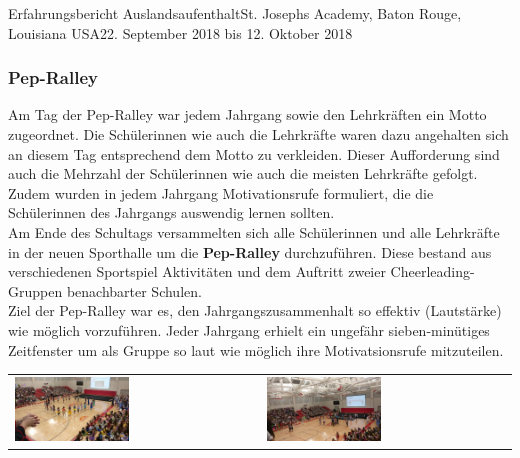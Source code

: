 \documentclass[oneside,openany,headings=optiontotoc,11pt,numbers=noenddot]{article}
\begin{document}
\begin{worksheet}{Erfahrungsbericht Auslandsaufenthalt}{St. Joseph\grq{}s Academy, Baton Rouge, Louisiana USA}{22. September 2018 bis 12. Oktober 2018}
		\subsubsection*{Pep-Ralley}
		Am Tag der Pep-Ralley war jedem Jahrgang sowie den Lehrkräften ein Motto zugeordnet. Die Schülerinnen wie auch die Lehrkräfte waren dazu angehalten sich an diesem Tag entsprechend dem Motto zu verkleiden. Dieser Aufforderung sind auch die Mehrzahl der Schülerinnen wie auch die meisten Lehrkräfte gefolgt.\\
		Zudem wurden in jedem Jahrgang \grq{}Motivationsrufe\grq{} formuliert, die die Schülerinnen des Jahrgangs auswendig lernen sollten.\\
		Am Ende des Schultags versammelten sich alle Schülerinnen und alle Lehrkräfte in der neuen Sporthalle um die \textbf{Pep-Ralley} durchzuführen. Diese bestand aus verschiedenen Sportspiel Aktivitäten und dem Auftritt zweier Cheerleading-Gruppen benachbarter Schulen.\\
		Ziel der Pep-Ralley war es, den Jahrgangszusammenhalt so effektiv (Lautstärke) wie möglich vorzuführen. Jeder Jahrgang erhielt ein ungefähr sieben-minütiges Zeitfenster um als Gruppe so laut wie möglich ihre \grq{}Motivatsionsrufe\grq{} mitzuteilen.\\
		\par\noindent
		\begin{center}
			\begin{tabularx}{\textwidth}{XX}
				\includegraphics[width=0.48\textwidth]{../99_Bilder/00_pepralley.jpg} & \includegraphics[width=0.48\textwidth]{../99_Bilder/01_pepralley.jpg}
			\end{tabularx}\\
		\end{center}
		\par\noindent

\end{worksheet}
\end{document}
